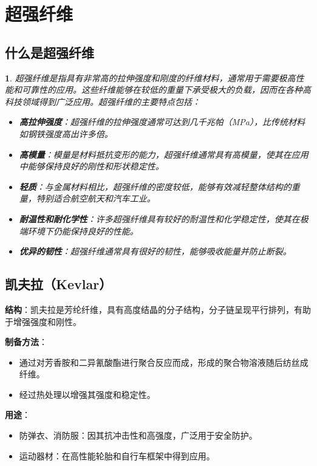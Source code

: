 \documentclass[UTF8]{report}
\theoremstyle{MyLineTheoremStyle} %
\theoremstyle{MyBlockTheoremStyle} %
\theoremstyle{MySubsubsectionStyle} %
\newtheorem{definition}{}
\begin{document}
\section{超强纤维}

\subsection{什么是超强纤维}

\begin{definition}

    超强纤维是指具有非常高的拉伸强度和刚度的纤维材料，通常用于需要极高性能和可靠性的应用。这些纤维能够在较低的重量下承受极大的负载，因而在各种高科技领域得到广泛应用。超强纤维的主要特点包括：
    
    \begin{itemize}
        \item \textbf{高拉伸强度}：超强纤维的拉伸强度通常可达到几千兆帕（MPa），比传统材料如钢铁强度高出许多倍。
        \item \textbf{高模量}：模量是材料抵抗变形的能力，超强纤维通常具有高模量，使其在应用中能够保持良好的刚性和形状稳定性。
        \item \textbf{轻质}：与金属材料相比，超强纤维的密度较低，能够有效减轻整体结构的重量，特别适合航空航天和汽车工业。
        \item \textbf{耐温性和耐化学性}：许多超强纤维具有较好的耐温性和化学稳定性，使其在极端环境下仍能保持良好的性能。
        \item \textbf{优异的韧性}：超强纤维通常具有很好的韧性，能够吸收能量并防止断裂。
    \end{itemize}
    
\end{definition}


\subsection{凯夫拉（Kevlar）}
\textbf{结构}：凯夫拉是芳纶纤维，具有高度结晶的分子结构，分子链呈现平行排列，有助于增强强度和刚性。

\textbf{制备方法}：
\begin{itemize}
    \item 通过对芳香胺和二异氰酸酯进行聚合反应而成，形成的聚合物溶液随后纺丝成纤维。
    \item 经过热处理以增强其强度和稳定性。
\end{itemize}

\textbf{用途}：
\begin{itemize}
    \item 防弹衣、消防服：因其抗冲击性和高强度，广泛用于安全防护。
    \item 运动器材：在高性能轮胎和自行车框架中得到应用。
\end{itemize}
\end{document}
